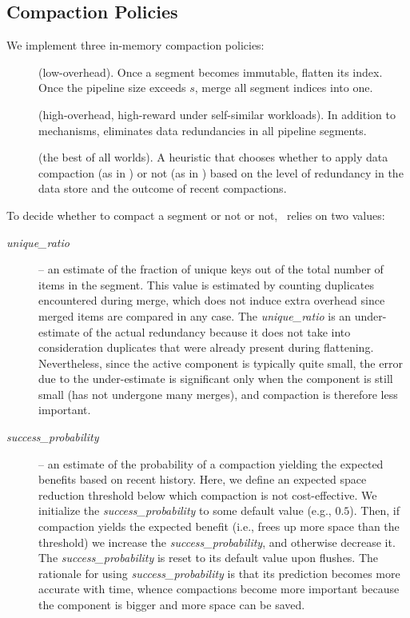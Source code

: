 \subsection{Compaction Policies} \label{ssec:policies}

We implement three in-memory compaction policies: 
\begin{description}
\item[\basic] (low-overhead). Once a segment becomes immutable, flatten its index. Once the pipeline size exceeds $s$, 
merge all segment indices into one.  
\item[\eager] (high-overhead, high-reward under self-similar workloads). 
In addition to \basic\/ mechanisms, eliminates data redundancies in all pipeline segments.
\item[\adp] (the best of all worlds). A heuristic that chooses whether to apply data compaction (as in \eager) or not (as in \basic) 
based on the level of redundancy in the data store and the outcome of recent compactions. 
\end{description}

To decide whether to compact a segment or not or not, \adp\ relies on two values:
\begin{description}
\item[\emph{unique\_ratio}] -- an estimate of the fraction of unique keys out of the total number of items in the segment. 
This value is estimated by counting duplicates encountered during merge, which does not induce extra overhead since
merged items are compared in any case. The \emph{unique\_ratio}  is an under-estimate of the actual redundancy because it does not 
take into consideration duplicates that were already present during flattening. Nevertheless, since the active component
is typically quite small, the error due to the under-estimate is significant only when the component is still small 
(has not undergone many merges), and compaction is therefore less important.
\item[\emph{success\_probability}] -- an estimate of the probability of a compaction yielding the expected benefits based on recent history.
Here, we define an expected space reduction threshold below which compaction is not cost-effective. 
We initialize the \emph{success\_probability} to some default value (e.g., $0.5$). 
Then, if compaction yields the expected benefit (i.e., frees up more space than the threshold) we increase the \emph{success\_probability},
and otherwise decrease it. The \emph{success\_probability} is reset to its default value upon flushes. 
The rationale for using \emph{success\_probability} is that its prediction becomes more accurate with time, whence 
compactions become more important because the component is bigger and more space can be saved.
\end{description}


